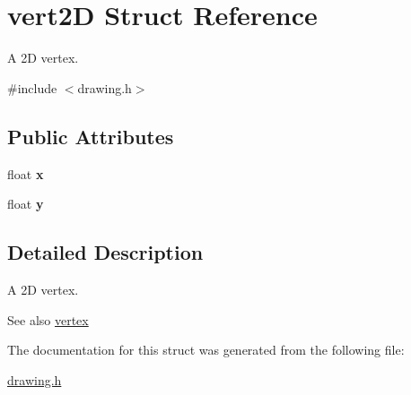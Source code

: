 \hypertarget{structvert2_d}{}\section{vert2D Struct Reference}
\label{structvert2_d}


A 2D vertex.  




{\ttfamily \#include $<$drawing.\+h$>$}

\subsection*{Public Attributes}
\begin{DoxyCompactItemize}
\item 
\mbox{\label{structvert2_d_ac76618e2458c9d2c19e24e3e5ef92eb9}} 
float {\bfseries x}
\item 
\mbox{\label{structvert2_d_a9d26c64b1b08d9d2c00ef1d94a17b923}} 
float {\bfseries y}
\end{DoxyCompactItemize}


\subsection{Detailed Description}
A 2D vertex. 

\begin{DoxySeeAlso}{See also}
\mbox{\hyperlink{structvertex}{vertex}} 
\end{DoxySeeAlso}


The documentation for this struct was generated from the following file\+:\begin{DoxyCompactItemize}
\item 
\mbox{\hyperlink{drawing_8h}{drawing.\+h}}\end{DoxyCompactItemize}
